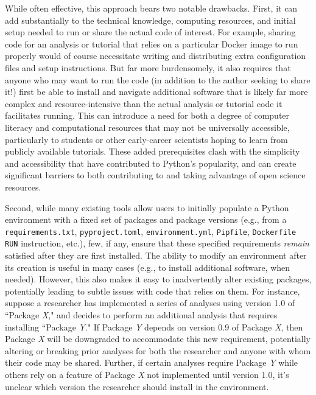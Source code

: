 \documentclass[preprint,12pt, a4paper]{elsarticle}
\begin{document}
While often effective, this approach bears two notable drawbacks.
First, it can add substantially to the technical knowledge, computing resources, and initial setup needed to run or share the actual code of interest.
For example, sharing code for an analysis or tutorial that relies on a particular Docker image to run properly would of course necessitate writing and distributing extra configuration files and setup instructions.
But far more burdensomely, it also requires that anyone who may want to run the code (in addition to the author seeking to share it!) first be able to install and navigate additional software that is likely far more complex and resource-intensive than the actual analysis or tutorial code it facilitates running.
This can introduce a need for both a degree of computer literacy and computational resources that may not be universally accessible, particularly to students or other early-career scientists hoping to learn from publicly available tutorials.
These added prerequisites clash with the simplicity and accessibility that have contributed to Python's popularity, and can create significant barriers to both contributing to and taking advantage of open science resources.

Second, while many existing tools allow users to initially populate a Python environment with a fixed set of packages and package versions (e.g., from a \texttt{requirements.txt}, \texttt{pyproject.toml}, \texttt{environment.yml}, \texttt{Pipfile}, \texttt{Dockerfile RUN} instruction, etc.), few, if any, ensure that these specified requirements \textit{remain} satisfied after they are first installed.
The ability to modify an environment after its creation is useful in many cases (e.g., to install additional software, when needed). However, this also makes it easy to inadvertently alter existing packages, potentially leading to subtle issues with code that relies on them.
For instance, suppose a researcher has implemented a series of analyses using version 1.0 of ``Package \textit{X}," and decides to  perform an additional analysis that requires installing ``Package \textit{Y}."
If Package \textit{Y} depends on version 0.9 of Package \textit{X}, then Package \textit{X} will be downgraded to accommodate this new requirement, potentially altering or breaking prior analyses for both the researcher and anyone with whom their code may be shared.
Further, if certain analyses require Package \textit{Y} while others rely on a feature of Package \textit{X} not implemented until version 1.0, it's unclear which version the researcher should install in the environment.
\end{document}
